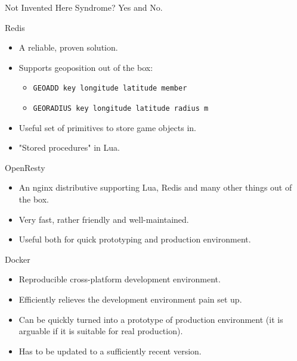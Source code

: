 \documentclass[aspectratio=169,handout,bigger]{beamer}
\begin{document}

\begin{frame}{Not Invented Here Syndrome?}
  Yes and No.
\end{frame}


\begin{frame}{Redis}
  \begin{itemize}
    \item A reliable, proven solution.
    \item Supports geoposition out of the box:
    \begin{itemize}
      \item \texttt{GEOADD key longitude latitude member}
      \item \texttt{GEORADIUS key longitude latitude radius m}
    \end{itemize}
    \item Useful set of primitives to store game objects in.
    \item "Stored procedures" in Lua.
  \end{itemize}
\end{frame}


\begin{frame}{OpenResty}
  \begin{itemize}
    \item An nginx distributive supporting
          Lua, Redis and many other things out of the box.
    \item Very fast, rather friendly and well-maintained.
    \item Useful both for quick prototyping and production environment.
  \end{itemize}
\end{frame}


\begin{frame}{Docker}
  \begin{itemize}
    \item Reproducible cross-platform development environment.
    \item Efficiently relieves the development environment pain set up.
    \item Can be quickly turned into a prototype of production environment
          (it is arguable if it is suitable for real production).
    \item Has to be updated to a sufficiently recent version.
  \end{itemize}
\end{frame}
\end{document}
